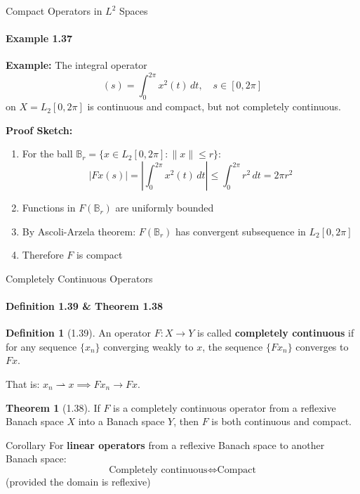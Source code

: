 \documentclass[aspectratio=169,10pt]{beamer}
\theoremstyle{definition}
\newtheorem{defn}{Definition}
\newtheorem{thm}{Theorem}
\begin{document}
\begin{frame}[fragile]{Compact Operators in $L^2$ Spaces}
\framesubtitle{Example 1.37}

\textbf{Example:} The integral operator
\begin{equation*}
[Fx](s) = \int_0^{2\pi} x^2(t) \, dt, \quad s \in [0, 2\pi]
\end{equation*}
on $X = L_2[0, 2\pi]$ is continuous and compact, but not completely continuous.

\vspace{0.3cm}

\textbf{Proof Sketch:}
\begin{enumerate}
    \item For the ball $\mathbb{B}_r = \{x \in L_2[0,2\pi] : \|x\| \leq r\}$:
    \begin{equation*}
    |Fx(s)| = \left|\int_0^{2\pi} x^2(t) \, dt\right| \leq \int_0^{2\pi} r^2 \, dt = 2\pi r^2
    \end{equation*}

    \item Functions in $F(\mathbb{B}_r)$ are uniformly bounded

    \item By Ascoli-Arzela theorem: $F(\mathbb{B}_r)$ has convergent subsequence in $L_2[0,2\pi]$

    \item Therefore $F$ is compact
\end{enumerate}
\end{frame}

\begin{frame}{Completely Continuous Operators}
\framesubtitle{Definition 1.39 \& Theorem 1.38}

\begin{defn}[1.39]
An operator $F: X \to Y$ is called \textbf{completely continuous} if for any sequence $\{x_n\}$ converging weakly to $x$, the sequence $\{Fx_n\}$ converges to $Fx$.

That is: $x_n \rightharpoonup x \implies Fx_n \to Fx$.
\end{defn}

\vspace{0.3cm}

\begin{thm}[1.38]
If $F$ is a completely continuous operator from a reflexive Banach space $X$ into a Banach space $Y$, then $F$ is both continuous and compact.
\end{thm}

\vspace{0.3cm}

\begin{block}{Corollary}
For \textbf{linear operators} from a reflexive Banach space to another Banach space:
\begin{equation*}
\text{Completely continuous} \iff \text{Compact}
\end{equation*}
(provided the domain is reflexive)
\end{block}
\end{frame}
\end{document}
